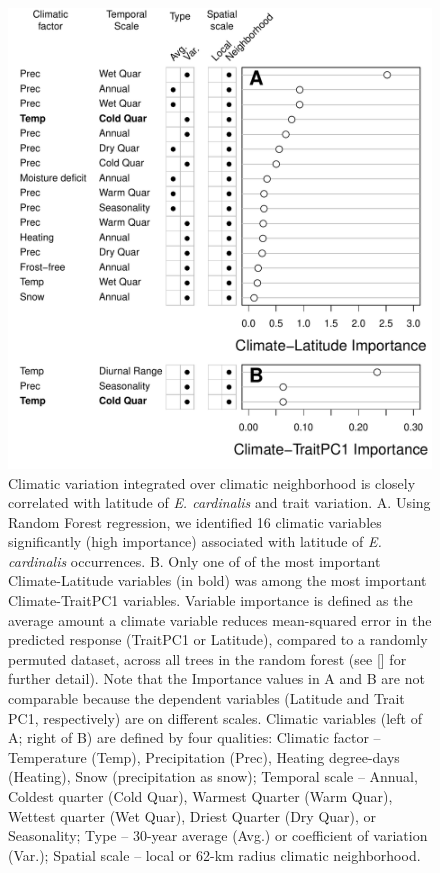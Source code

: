\documentclass[11pt, oneside]{article}
\begin{document}
\begin{figure}[h!]
	\centerline{\includegraphics[width=1\textwidth]{Figures/Figure_ClimVarImp.pdf}}
	\fontsize{10}{12}
	\selectfont
	\caption[Climatic variation integrated over climatic neighborhood is closely correlated with latitude of \textit{E. cardinalis} and trait variation]{Climatic variation integrated over climatic neighborhood is closely correlated with latitude of \textit{E. cardinalis} and trait variation.  A. Using Random Forest regression, we identified 16 climatic variables significantly (high importance) associated with latitude of \textit{E. cardinalis} occurrences. B. Only one of of the most important Climate-Latitude variables (in bold) was among the most important Climate-TraitPC1 variables. Variable importance is defined as the average amount a climate variable reduces mean-squared error in the predicted response (TraitPC1 or Latitude), compared to a randomly permuted dataset, across all trees in the random forest (see \citeauthor{Genuer_etal_2015} [\citeyear{Genuer_etal_2015}] for further detail). Note that the Importance values in A and B are not comparable because the dependent variables (Latitude and Trait PC1, respectively) are on different scales. Climatic variables (left of A; right of B) are defined by four qualities: Climatic factor -- Temperature (Temp), Precipitation (Prec), Heating degree-days (Heating), Snow (precipitation as snow); Temporal scale -- Annual, Coldest quarter (Cold Quar), Warmest Quarter (Warm Quar), Wettest quarter (Wet Quar), Driest Quarter (Dry Quar), or Seasonality; Type -- 30-year average (Avg.) or coefficient of variation (Var.); Spatial scale -- local or 62-km radius climatic neighborhood.}
	\label{fig:Fig_ClimVarImp}
\end{figure}
\end{document}
